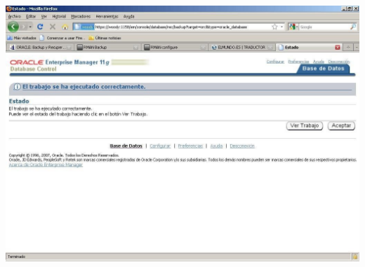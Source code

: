\begin{enumerate}[1.]
	\begin{center}
	\includegraphics[width=15cm]{./Imagenes/img-4-2-7}  
	\end{center}




\end{enumerate}
